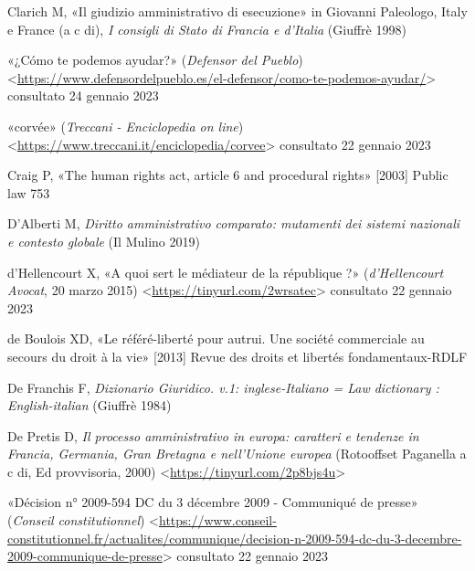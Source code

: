 \documentclass[12pt,it,a4paper,]{report}
\newlength{\cslhangindent}
\newenvironment{CSLReferences}[2] %
 {%
  \setlength{\parindent}{0pt}
  \ifodd #1 \everypar{\setlength{\hangindent}{\cslhangindent}}\ignorespaces\fi
  \ifnum #2 > 0
  \setlength{\parskip}{#2\baselineskip}
  \fi
 }%
 {}
\begin{document}
\begin{CSLReferences}{0}{0}
\leavevmode{}%
Clarich M, {«Il giudizio amministrativo di esecuzione»} in Giovanni
Paleologo, Italy e France (a c di), \emph{I consigli di Stato di Francia
e d'Italia} (Giuffrè 1998)

\leavevmode{}%
{«¿Cómo te podemos ayudar?»} (\emph{Defensor del Pueblo})
\textless{}\url{https://www.defensordelpueblo.es/el-defensor/como-te-podemos-ayudar/}\textgreater{}
consultato 24 gennaio 2023

\leavevmode{}%
{«corvée»} (\emph{Treccani - Enciclopedia on line})
\textless{}\url{https://www.treccani.it/enciclopedia/corvee}\textgreater{}
consultato 22 gennaio 2023

\leavevmode{}%
Craig P, {«The human rights act, article 6 and procedural rights»}
{[}2003{]} Public law 753

\leavevmode{}%
D'Alberti M, \emph{Diritto amministrativo comparato: mutamenti dei
sistemi nazionali e contesto globale} (Il Mulino 2019)

\leavevmode{}%
d'Hellencourt X, {«A quoi sert le médiateur de la république ?»}
(\emph{d'Hellencourt Avocat}, 20 marzo 2015)
\textless{}\url{https://tinyurl.com/2wrsatec}\textgreater{} consultato
22 gennaio 2023

\leavevmode{}%
de Boulois XD, {«Le référé-liberté pour autrui. Une société commerciale
au secours du droit à la vie»} {[}2013{]} Revue des droits et libertés
fondamentaux-RDLF

\leavevmode{}%
De Franchis F, \emph{Dizionario Giuridico. v.1: inglese-Italiano = Law
dictionary : English-italian} (Giuffrè 1984)

\leavevmode{}%
De Pretis D, \emph{Il processo amministrativo in europa: caratteri e
tendenze in Francia, Germania, Gran Bretagna e nell'Unione europea}
(Rotooffset Paganella a c di, Ed provvisoria, 2000)
\textless{}\url{https://tinyurl.com/2p8bjs4u}\textgreater{}

\leavevmode{}%
{«Décision n° 2009-594 DC du 3 décembre 2009 - Communiqué de presse»}
(\emph{Conseil constitutionnel})
\textless{}\url{https://www.conseil-constitutionnel.fr/actualites/communique/decision-n-2009-594-dc-du-3-decembre-2009-communique-de-presse}\textgreater{}
consultato 22 gennaio 2023


\end{CSLReferences}
\end{document}
